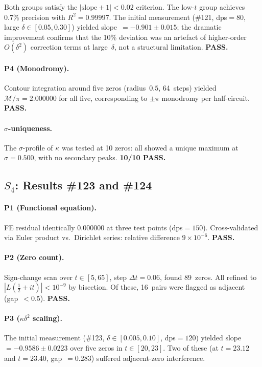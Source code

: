 \documentclass[11pt, a4paper]{article}
\theoremstyle{plain}
\theoremstyle{definition}
\newcommand{\abs}[1]{\left|#1\right|}
\newcommand{\kap}{\kappa}             %
\newcommand{\mono}{\mathcal{M}}       %
\begin{document}
Both groups satisfy the $\abs{\text{slope}+1} < 0.02$ criterion.  The
low-$t$ group achieves 0.7\% precision with $R^{2} = 0.99997$.  The
initial measurement (\#121, dps${}=80$, large $\delta \in
[0.05,0.30]$) yielded slope~$= -0.901 \pm 0.015$; the dramatic
improvement confirms that the 10\% deviation was an artefact of
higher-order $O(\delta^{2})$ correction terms at large~$\delta$, not
a structural limitation.  \textbf{PASS.}

\paragraph{P4 (Monodromy).}
Contour integration around five zeros (radius~$0.5$, 64~steps)
yielded $\mono/\pi = 2.000000$ for all five, corresponding to
$\pm\pi$ monodromy per half-circuit.  \textbf{PASS.}

\paragraph{$\sigma$-uniqueness.}
The $\sigma$-profile of $\kap$ was tested at 10 zeros: all showed
a unique maximum at $\sigma = 0.500$, with no secondary peaks.
\textbf{10/10 PASS.}


\subsection{$S_{4}$: Results \#123 and \#124}
\label{sec:s4-results}

\paragraph{P1 (Functional equation).}
FE residual identically $0.000000$ at three test points
(dps${}=150$).  Cross-validated via Euler product vs.\ Dirichlet
series: relative difference $9 \times 10^{-6}$.  \textbf{PASS.}

\paragraph{P2 (Zero count).}
Sign-change scan over $t \in [5, 65]$, step $\Delta t = 0.06$, found
89~zeros.  All refined to $\abs{L(\tfrac{1}{2}+it)} < 10^{-9}$ by
bisection.  Of these, 16~pairs were flagged as adjacent (gap~$<0.5$).
\textbf{PASS.}

\paragraph{P3 ($\kap\delta^{2}$ scaling).}
The initial measurement (\#123, $\delta \in [0.005, 0.10]$,
dps${}=120$) yielded slope $= -0.9586 \pm 0.0223$ over five zeros in
$t \in [20,23]$.  Two of these (at $t = 23.12$ and $t = 23.40$,
gap~$= 0.283$) suffered adjacent-zero interference.
\end{document}
